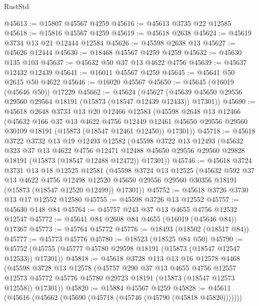 \begin{lexlean}{RustStd}
\begin{coremodule}
@45613 := @15807 @45567 @4259
@45616 := @45613 @3735 @22 @12585
@45618 := @15816 @45567 @4259
@45619 := @45618 @2638
@45624 := @45619 @3734 @13 @21 @12444 @12584
@45626 := @45598 @2638 @13
@45627 := @45626 @12444
@45630 := @18468 @45567 @4259 @4259
@45632 := @45630 @135 @103
@45637 := @45632 @50 @37 @13 @4622 @4756
@45639 := @45637 @12432 @12439
@45641 := @16011 @45567 @4259
@45645 := @45641 @50 @2615 @50 @4622
@45646 := @16020 @45567
@45650 := @45645 (@16019 (@45646 @50)) @17229
@45662 := @45624
    (@45627 (@45639 @45650 @29556 @29560 @29564 @18191 (@15873 (@18547 @12439 @12433)) @17301))
@45690 := @45618
    @2648
    @3733
    @13
    @20
    @12466
    @12583
    (@45598
      @2648
      @13
      @12466
      (@45632
        @166
        @37
        @13
        @4622
        @4756
        @12449
        @12461
        @45650
        @29556
        @29560
        @30109
        @18191
        (@15873 (@18547 @12461 @12450))
        @17301))
@45718 := @45618
    @3722
    @3732
    @13
    @19
    @12493
    @12582
    (@45598
      @3722
      @13
      @12493
      (@45632
        @323
        @37
        @13
        @4622
        @4756
        @12471
        @12488
        @45650
        @29556
        @29560
        @29828
        @18191
        (@15873 (@18547 @12488 @12472))
        @17301))
@45746 := @45618
    @3724
    @3731
    @13
    @18
    @12525
    @12581
    (@45598
      @3724
      @13
      @12525
      (@45632
        @592
        @37
        @13
        @4622
        @4756
        @12498
        @12520
        @45650
        @29556
        @29560
        @30356
        @18191
        (@15873 (@18547 @12520 @12499))
        @17301))
@45752 := @45618 @3726 @3730 @13 @17 @12552 @12580
@45755 := @45598 @3726 @13 @12552
@45757 := @45630 @148 @84
@45764 := @45757 @243 @37 @13 @4655 @4756 @12532 @12547
@45772 := @45641 @84 @2608 @84 @4655 (@16019 (@45646 @84)) @17367
@45773 := @45764 @45772
@45776 := @18493 (@18502 (@18517 @84))
@45777 := @45773 @45776
@45780 := @18523 (@18525 @84 @50)
@45790 := @45752 (@45755 (@45777 @45780 @29598 @18191 (@15873 (@18547 @12547 @12533)) @17301))
@45818 := @45618
    @3728
    @113
    @13
    @16
    @12578
    @4468
    (@45598
      @3728
      @13
      @12578
      (@45757
        @290
        @37
        @13
        @4655
        @4756
        @12557
        @12573
        @45772
        @45776
        @45780
        @29723
        @18191
        (@15873 (@18547 @12573 @12558))
        @17301))
@45820 := @15884 @45567 @4259
@45828 := @45611 (@45616 (@45662 (@45690 (@45718 (@45746 (@45790 (@45818 @45820)))))))

\end{coremodule}
\end{lexlean}

